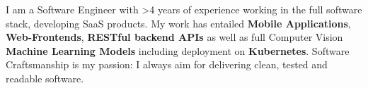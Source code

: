 \documentclass[8pt]{developercv} %
\begin{document}
\vspace{0.5cm}



\begin{minipage}[t]{0.4\textwidth} %
	\vspace{-\baselineskip} %
	
	I am a Software Engineer with >4 years of experience working in the full software stack, developing SaaS products. My work has entailed \textbf{Mobile Applications}, \textbf{Web-Frontends}, \textbf{RESTful backend APIs} as well as full Computer Vision \textbf{Machine Learning Models} including deployment on \textbf{Kubernetes}. Software Craftsmanship is my passion: I always aim for delivering clean, tested and readable software.
\end{minipage}
\hfill %
\begin{minipage}[t]{0.5\textwidth} %
	\vspace{-\baselineskip} %
	\begin{barchart}{5.5}
	\end{barchart}
\end{minipage}



\end{document}
